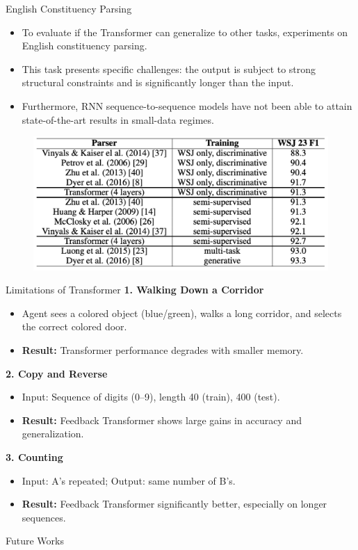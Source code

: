 \documentclass{beamer}
\begin{document}
\begin{frame}{English Constituency Parsing}
\begin{itemize}
    \item To evaluate if the Transformer can generalize to other tasks, experiments on English constituency parsing.
    
    \item This task presents specific challenges: the output is subject to strong structural constraints and is significantly longer than the input. 
    
    \item Furthermore, RNN sequence-to-sequence models have not been able to attain state-of-the-art results in small-data regimes.
\end{itemize}

\begin{figure}
    \centering
    \includegraphics[width=0.8\linewidth]{f23.png}
    \label{fig:enter-label}
\end{figure}
\end{frame}

\begin{frame}{Limitations of Transformer}\renewcommand{\thefootnote}{}
\textbf{1. Walking Down a Corridor}
\begin{itemize}
    \item Agent sees a colored object (blue/green), walks a long corridor, and selects the correct colored door.
    \item \textbf{Result:} Transformer performance degrades with smaller memory.
\end{itemize}

\textbf{2. Copy and Reverse}
\begin{itemize}
    \item Input: Sequence of digits (0–9), length 40 (train), 400 (test).
    \item \textbf{Result:} Feedback Transformer shows large gains in accuracy and generalization.
\end{itemize}

\textbf{3. Counting}
\begin{itemize}
    \item Input: A’s repeated; Output: same number of B’s.
    \item \textbf{Result:} Feedback Transformer significantly better, especially on longer sequences.
\end{itemize}
    
\end{frame}

\begin{frame}{Future Works}




    
\end{frame}
    
\end{document}
